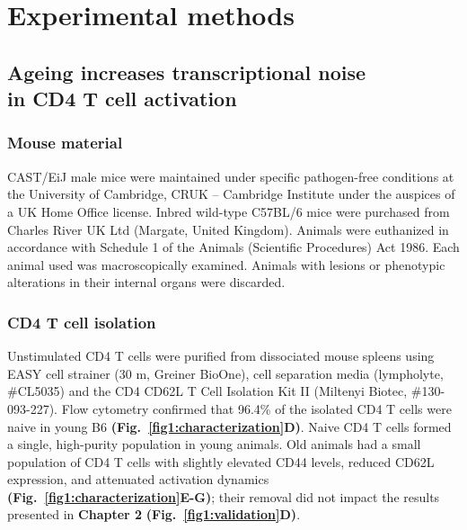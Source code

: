 
\chapter{Experimental methods} 

\section{Ageing increases transcriptional noise \\
in CD4\plus{} T cell activation}
\label{appA.1}

\subsection{Mouse material}

CAST/EiJ male mice were maintained under specific pathogen-free conditions at the University of Cambridge, CRUK – Cambridge Institute under the auspices of a UK Home Office license. Inbred wild-type C57BL/6 mice were purchased from Charles River UK Ltd (Margate, United Kingdom). Animals were euthanized in accordance with Schedule 1 of the Animals (Scientific Procedures) Act 1986. Each animal used was macroscopically examined. Animals with lesions or phenotypic alterations in their internal organs were discarded. 

\subsection{CD4\plus{} T cell isolation}
\label{appA.1:isolation}

Unstimulated CD4\plus{} T cells were purified from dissociated mouse spleens using EASY cell strainer (30 \textmu{}m, Greiner BioOne), cell separation media (lympholyte, \#{}CL5035) and the CD4\plus{} CD62L\plus{} T Cell Isolation Kit II (Miltenyi Biotec, \#{}130-093-227). Flow cytometry confirmed that 96.4\% of the isolated CD4\plus{} T cells were naive in young B6 \textbf{(Fig.~\ref{fig1:characterization}D)}. Naive CD4\plus{} T cells formed a single, high-purity population in young animals. Old animals had a small population of CD4\plus{} T cells with slightly elevated CD44 levels, reduced CD62L expression, and attenuated activation dynamics \textbf{(Fig.~\ref{fig1:characterization}E-G)}; their removal did not impact the results presented in \textbf{Chapter 2} \textbf{(Fig.~\ref{fig1:validation}D)}.\\

